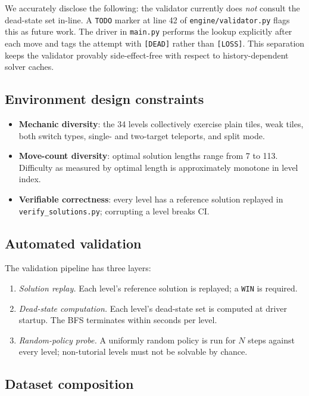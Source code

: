We accurately disclose the following: the validator currently does \emph{not} consult
the dead-state set in-line. A \texttt{TODO} marker at line 42 of
\texttt{engine/validator.py} flags this as future work. The driver in \texttt{main.py}
performs the lookup explicitly after each move and tags the attempt with
\texttt{[DEAD]} rather than \texttt{[LOSS]}. This separation keeps the validator
provably side-effect-free with respect to history-dependent solver caches.

\subsection{Environment design constraints}

\begin{itemize}[leftmargin=1.5em]
    \item \textbf{Mechanic diversity}: the 34 levels collectively exercise plain
      tiles, weak tiles, both switch types, single- and two-target teleports, and split
      mode.
    \item \textbf{Move-count diversity}: optimal solution lengths range from 7 to
      113. Difficulty as measured by optimal length is approximately monotone in
      level index.
    \item \textbf{Verifiable correctness}: every level has a reference solution
      replayed in \texttt{verify\_solutions.py}; corrupting a level breaks CI.
\end{itemize}

\subsection{Automated validation}

The validation pipeline has three layers:
\begin{enumerate}[leftmargin=1.5em]
    \item \emph{Solution replay.} Each level's reference solution is replayed; a
      \texttt{WIN} is required.
    \item \emph{Dead-state computation.} Each level's dead-state set is computed at
      driver startup. The BFS terminates within seconds per level.
    \item \emph{Random-policy probe.} A uniformly random policy is run for $N$ steps
      against every level; non-tutorial levels must not be solvable by chance.
\end{enumerate}

\subsection{Dataset composition}
\label{sec:dataset}

